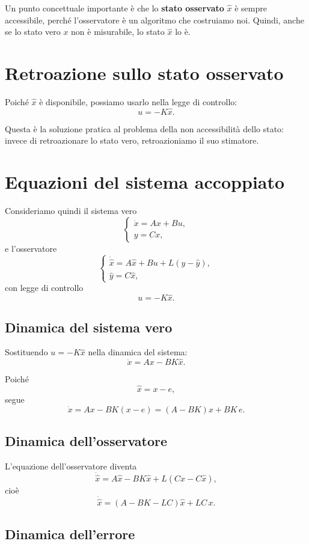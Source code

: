 Un punto concettuale importante è che lo \textbf{stato osservato} \(\hat x\)
è sempre accessibile, perché l'osservatore è un algoritmo che costruiamo noi.
Quindi, anche se lo stato vero \(x\) non è misurabile, lo stato \(\hat x\) lo è.

\section{Retroazione sullo stato osservato}

Poiché \(\hat x\) è disponibile, possiamo usarlo nella legge di controllo:
\[
u=-K\hat x.
\]

Questa è la soluzione pratica al problema della non accessibilità dello stato:
invece di retroazionare lo stato vero, retroazioniamo il suo stimatore.

\section{Equazioni del sistema accoppiato}

Consideriamo quindi il sistema vero
\[
\begin{cases}
\dot x = Ax + Bu,\\
y = Cx,
\end{cases}
\]
e l'osservatore
\[
\begin{cases}
\dot{\hat x} = A\hat x + Bu + L(y-\hat y),\\
\hat y = C\hat x,
\end{cases}
\]
con legge di controllo
\[
u=-K\hat x.
\]

\subsection{Dinamica del sistema vero}

Sostituendo \(u=-K\hat x\) nella dinamica del sistema:
\[
\dot x = Ax - BK\hat x.
\]

Poiché
\[
\hat x = x-e,
\]
segue
\[
\dot x = A x - BK(x-e)
= (A-BK)x + BK\,e.
\]

\subsection{Dinamica dell'osservatore}

L'equazione dell'osservatore diventa
\[
\dot{\hat x}
=
A\hat x - BK\hat x + L(Cx-C\hat x),
\]
cioè
\[
\dot{\hat x}
=
(A-BK-LC)\hat x + LC\,x.
\]

\subsection{Dinamica dell'errore}

